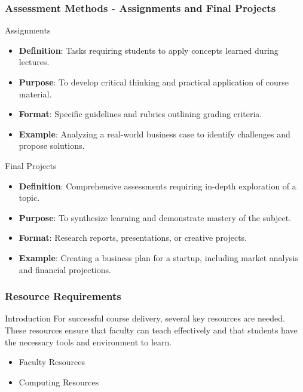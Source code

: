 \documentclass[aspectratio=169]{beamer}
\begin{document}
\begin{frame}[fragile]
    \frametitle{Assessment Methods - Assignments and Final Projects}
    \begin{block}{Assignments}
        \begin{itemize}
            \item \textbf{Definition}: Tasks requiring students to apply concepts learned during lectures.
            \item \textbf{Purpose}: To develop critical thinking and practical application of course material.
            \item \textbf{Format}: Specific guidelines and rubrics outlining grading criteria.
            \item \textbf{Example}: Analyzing a real-world business case to identify challenges and propose solutions.
        \end{itemize}
    \end{block}

    \begin{block}{Final Projects}
        \begin{itemize}
            \item \textbf{Definition}: Comprehensive assessments requiring in-depth exploration of a topic.
            \item \textbf{Purpose}: To synthesize learning and demonstrate mastery of the subject.
            \item \textbf{Format}: Research reports, presentations, or creative projects.
            \item \textbf{Example}: Creating a business plan for a startup, including market analysis and financial projections.
        \end{itemize}
    \end{block}
\end{frame}

\begin{frame}[fragile]
    \frametitle{Resource Requirements}
    \begin{block}{Introduction}
        For successful course delivery, several key resources are needed. These resources ensure that faculty can teach effectively and that students have the necessary tools and environment to learn. 
    \end{block}
    \begin{itemize}
        \item Faculty Resources
        \item Computing Resources
    \end{itemize}
\end{frame}
\end{document}
